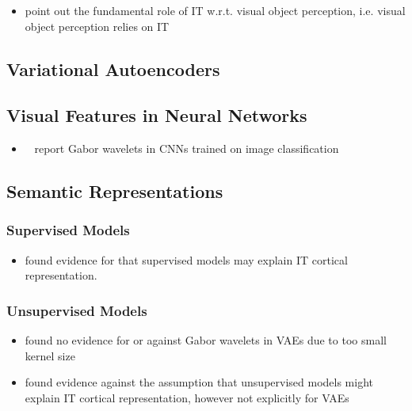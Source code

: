 \documentclass[11pt]{article}
\begin{document}
    \begin{itemize}
        \item \citet[pp. 1070, 1071]{squire2012fundamental} point out the fundamental role of IT w.r.t. visual object perception, i.e. visual object perception relies on IT
    \end{itemize}

    \subsection{Variational Autoencoders}\label{subsec:variational-autoencoders}

    \subsection{Visual Features in Neural Networks}\label{subsec:visual_features_in_neural_networks}
    \begin{itemize}
        \item~\cite{krizhevsky2012imagenet} report Gabor wavelets in \acp{CNN} trained on image classification
    \end{itemize}

    \subsection{Semantic Representations}\label{subsec:semantic-representations}

    \subsubsection{Supervised Models}
    \begin{itemize}
        \item \citet{khaligh2014deep} found evidence for that supervised models may explain \ac{IT} cortical representation.
    \end{itemize}

    \subsubsection{Unsupervised Models}
    \begin{itemize}
        \item \citet{han2019variational} found no evidence for or against Gabor wavelets in \acp{VAE} due to too small kernel size
        \item \citet{khaligh2014deep} found evidence against the assumption that unsupervised models might explain \ac{IT} cortical representation, however not explicitly for \acp{VAE}
    \end{itemize}
\end{document}
